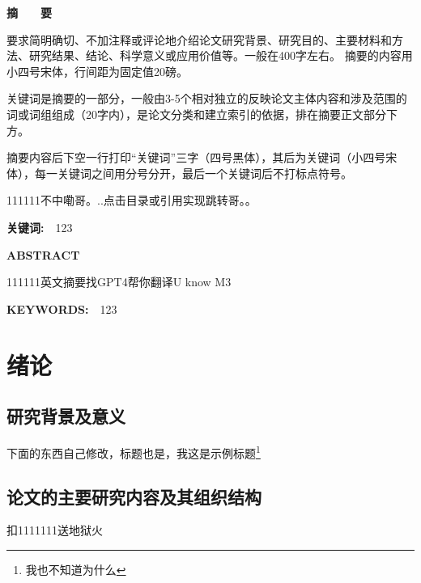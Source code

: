 \documentclass[UTF8,a4paper,12pt]{ctexart}
\begin{document}
	\begin{spacing}{1.4}
	\tableofcontents
	
	\end{spacing}
	\thispagestyle{fancy}
	\fancyfoot{}
	\newpage
	\fancyfoot[C]{\thepage} 
	 
	\centerline{\textbf{\fontsize{16pt}{\baselineskip}\heiti 摘　　要}}
	\vspace{0.4cm}
	要求简明确切、不加注释或评论地介绍论文研究背景、研究目的、主要材料和方法、研究结果、结论、科学意义或应用价值等。一般在400字左右。
	摘要的内容用小四号宋体，行间距为固定值20磅。
	\par 关键词是摘要的一部分，一般由3-5个相对独立的反映论文主体内容和涉及范围的词或词组组成（20字内），是论文分类和建立索引的依据，排在摘要正文部分下方。
	\par 摘要内容后下空一行打印“关键词”三字（四号黑体），其后为关键词（小四号宋体），每一关键词之间用分号分开，最后一个关键词后不打标点符号。
	
	\par 111111不中嘞哥。..点击目录或引用实现跳转哥。。

	\vspace{0.2cm}
	\par \textbf{\fontsize{14pt}{\baselineskip}\heiti 关键词:　}123
	\setcounter{page}{1}
	\newpage
	\centerline{\textbf{ABSTRACT}}
	\vspace{0.4cm}
	111111英文摘要找GPT4帮你翻译U know M3
	\vspace{0.4cm}
	\par \textbf{\large KEYWORDS:　}123
	\newpage
	\setcounter{page}{1}
	\section{绪论}
	\subsection{研究背景及意义}
	下面的东西自己修改，标题也是，我这是示例标题\footnote{我也不知道为什么}
	
	\subsection{论文的主要研究内容及其组织结构}
	扣1111111送地狱火
	
\end{document}

